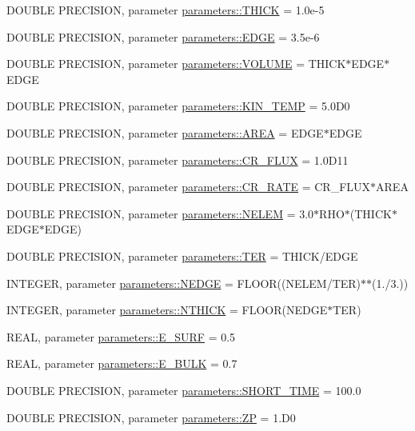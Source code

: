 \begin{DoxyCompactItemize}
\item 
DOUBLE PRECISION, parameter \hyperlink{namespaceparameters_aacbd355b27d7e7459076fdf3f77fab20}{parameters::THICK} = 1.0e-\/5
\item 
DOUBLE PRECISION, parameter \hyperlink{namespaceparameters_a45377074e21edf9bd71351430490cd5e}{parameters::EDGE} = 3.5e-\/6
\item 
DOUBLE PRECISION, parameter \hyperlink{namespaceparameters_a8a887d07bb62f10ae5578c2a7181a578}{parameters::VOLUME} = THICK$\ast$EDGE$\ast$EDGE
\item 
DOUBLE PRECISION, parameter \hyperlink{namespaceparameters_a144dd87a3ad4a40138cad0b8d26ee282}{parameters::KIN\_\-TEMP} = 5.0D0
\item 
DOUBLE PRECISION, parameter \hyperlink{namespaceparameters_aee8d50a231f8beed7edc0ff5ba2437f4}{parameters::AREA} = EDGE$\ast$EDGE
\item 
DOUBLE PRECISION, parameter \hyperlink{namespaceparameters_ad9a62be82a2fb56fe291f73d3279d4b4}{parameters::CR\_\-FLUX} = 1.0D11
\item 
DOUBLE PRECISION, parameter \hyperlink{namespaceparameters_ac433c7adc61bc138dfc7567a570833ed}{parameters::CR\_\-RATE} = CR\_\-FLUX$\ast$AREA
\item 
DOUBLE PRECISION, parameter \hyperlink{namespaceparameters_a20c80b2e34c240feef7ac6887646115d}{parameters::NELEM} = 3.0$\ast$RHO$\ast$(THICK$\ast$EDGE$\ast$EDGE)
\item 
DOUBLE PRECISION, parameter \hyperlink{namespaceparameters_adc91f63a6d2c197941c445a5d64800a3}{parameters::TER} = THICK/EDGE
\item 
INTEGER, parameter \hyperlink{namespaceparameters_a3f72bf9fb376fde5e0eaf3da242d4f06}{parameters::NEDGE} = FLOOR((NELEM/TER)$\ast$$\ast$(1./3.))
\item 
INTEGER, parameter \hyperlink{namespaceparameters_adf37b75c4792b28d45484737d230ead3}{parameters::NTHICK} = FLOOR(NEDGE$\ast$TER)
\item 
REAL, parameter \hyperlink{namespaceparameters_a10dd39ec5aeb14b9a104618dc6ef5450}{parameters::E\_\-SURF} = 0.5
\item 
REAL, parameter \hyperlink{namespaceparameters_a485a71bfcc9a08ed577efe9a5df5735b}{parameters::E\_\-BULK} = 0.7
\item 
DOUBLE PRECISION, parameter \hyperlink{namespaceparameters_a8b8f35affe261eb9ad1a1612ca3572a7}{parameters::SHORT\_\-TIME} = 100.0
\item 
DOUBLE PRECISION, parameter \hyperlink{namespaceparameters_af5f3e31c772340991fe768468c6a0dad}{parameters::ZP} = 1.D0
$$
\end{DoxyCompactItemize}
